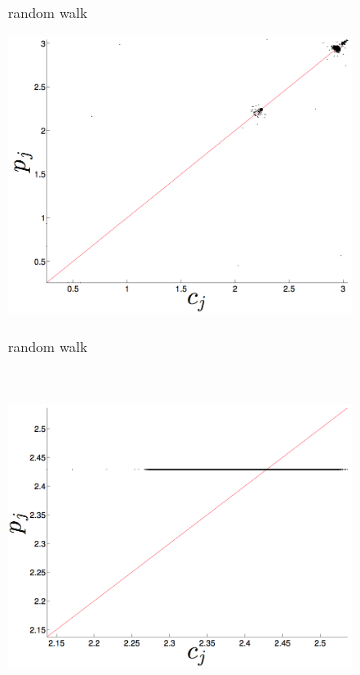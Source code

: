 \begin{figure}[htbp]
\begin{subfigure}{0.6\columnwidth}
    \caption{\gcc\\ random walk }
    \label{fig:gccMEAN}
  \end{subfigure}%
     \begin{subfigure}{0.6\columnwidth}
    \includegraphics[width=\columnwidth]{figs/svdfiveRWForecast.png}
    \caption{\svdfive\\ random walk}
    \label{fig:gccMEAN}
  \end{subfigure}%
  \\  
      \begin{subfigure}{0.6\columnwidth}
    \includegraphics[width=\columnwidth]{figs/colMeanForecast.png}

\end{subfigure}
\end{figure}
